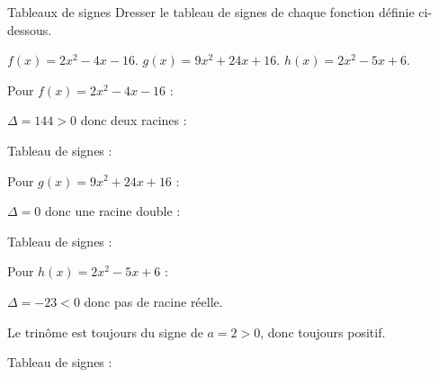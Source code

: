 \vspace{-3mm}
\def\rdifficulty{2}
\begin{EXO}{Tableaux de signes}{}
Dresser le tableau de signes de chaque fonction définie ci-dessous.
\vspace{-2mm}
\begin{tcbenumerate}[3]
\tcbitem {} $f(x)=2x^2-4x-16$.
\tcbitem {} $g(x)=9x^2+24x+16$.
\tcbitem {} $h(x)=2x^2-5x+6$.\\
\end{tcbenumerate}

\exocorrection

\begin{tcbenumerate}[1]
\tcbitem Pour $f(x)=2x^2-4x-16$ :


$\Delta = 144 > 0$ donc deux racines :


Tableau de signes :


\tcbitem Pour $g(x)=9x^2+24x+16$ :


$\Delta = 0$ donc une racine double :


Tableau de signes :


\tcbitem Pour $h(x)=2x^2-5x+6$ :


$\Delta = -23 < 0$ donc pas de racine réelle.

Le trinôme est toujours du signe de $a=2>0$, donc toujours positif.

Tableau de signes :

\end{tcbenumerate}
\end{EXO}

